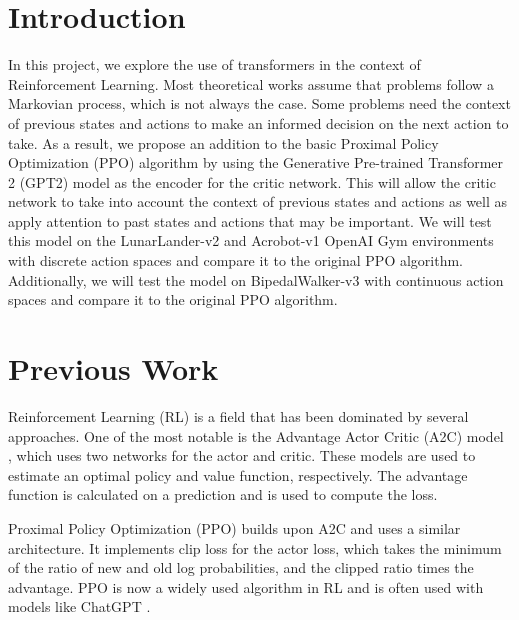 \documentclass[conference]{IEEEtran}
\begin{document}
\section{Introduction}
In this project, we explore the use of transformers in the context of Reinforcement Learning. Most theoretical works assume that problems follow a Markovian process, which is not always the case. Some problems need the context of previous states and actions to make an informed decision on the next action to take. As a result, we propose an addition to the basic Proximal Policy Optimization (PPO) algorithm by using the Generative Pre-trained Transformer 2 (GPT2) model as the encoder for the critic network. This will allow the critic network to take into account the context of previous states and actions as well as apply attention to past states and actions that may be important. We will test this model on the LunarLander-v2 and Acrobot-v1 OpenAI Gym environments with discrete action spaces and compare it to the original PPO algorithm. Additionally, we will test the model on BipedalWalker-v3 with continuous action spaces and compare it to the original PPO algorithm.


\section{Previous Work}

Reinforcement Learning (RL) is a field that has been dominated by several approaches. One of the most notable is the Advantage Actor Critic (A2C) model \cite{mnih2016asynchronous}, which uses two networks for the actor and critic. These models are used to estimate an optimal policy and value function, respectively. The advantage function is calculated on a prediction and is used to compute the loss.

Proximal Policy Optimization (PPO) \cite{schulman2017proximal} builds upon A2C and uses a similar architecture. It implements clip loss for the actor loss, which takes the minimum of the ratio of new and old log probabilities, and the clipped ratio times the advantage. PPO is now a widely used algorithm in RL and is often used with models like ChatGPT \cite{openai_2022}.
\end{document}
